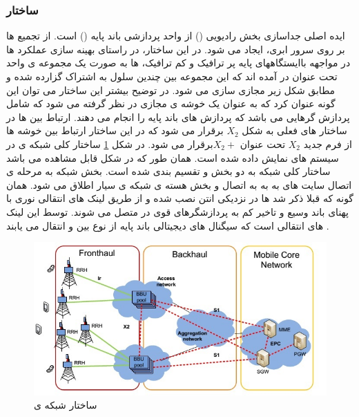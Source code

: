 \subsubsection{ساختار }




ایده اصلی  جداسازی بخش رادیویی () 
 از واحد پردازشی باند پایه ()
  است.
از تجمیع  ها بر روی سرور ابری،  ایجاد می شود.
در این ساختار، در راستای بهینه سازی عملکرد 
 ها در مواجهه باایستگاههای پایه پر ترافیک و کم ترافیک،
 ها به صورت یک مجموعه ی واحد تحت عنوان 
 در آمده اند که این مجموعه بین چندین سلول 
 به اشتراک گزارده شده و مطابق شکل زیر مجازی سازی
می شود. 
در توضیح بیشتر این ساختار می توان این گونه
عنوان کرد که  به عنوان یک خوشه ی مجازی
در نظر گرفته می شود که شامل پردازش گرهایی می باشد
که پردازش های باند پایه را انجام می دهند. ارتباط بین
  ها در ساختار های فعلی به شکل  $X_2$ برقرار می شود
که در این ساختار ارتباط بین خوشه ها از فرم جدید $X_2$
تحت عنوان  $X_2 +$برقرار می شود.
\newline
در شکل \ref{fig:C-RAN} ساختار کلی شبکه ی   در سیستم های
 نمایش داده شده است. همان طور که در شکل قابل
مشاهده می باشد ساختار کلی شبکه   به دو بخش
  و  تقسیم بندی شده است. بخش
 شبکه به مرحله ی اتصال سایت های به
 به  به اتصال  و بخش 
هسته ی شبکه ی سیار اطلاق می شود. همان گونه که قبلا
ذکر شد  ها در نزدیکی انتن نصب شده و از طریق
لینک های انتقالی نوری با پهنای باند وسیع و تاخیر کم به
پردازشگرهای قوی در  متصل می شوند. توسط این
لینک های انتقالی است که سیگنال های دیجیتالی باند
پایه از نوع  بین  و  انتقال می یابند \cite{checko2015cloud}.
\begin{figure}[H]
  \centering
    \includegraphics[width=\textwidth]{./fig/CRAN}
  \caption{ساختار شبکه ی  \cite{checko2015cloud}}
  \label{fig:C-RAN}
\end{figure}

